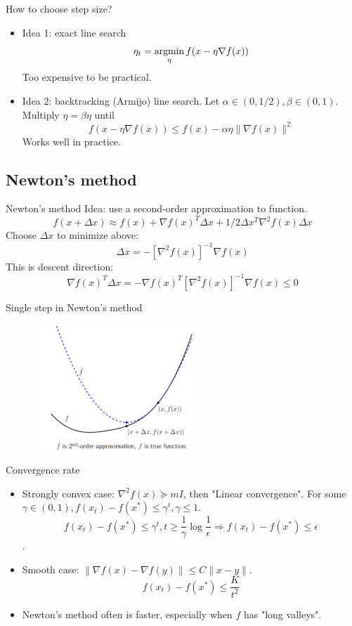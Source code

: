 \documentclass[notes]{beamer}
\begin{document}
\begin{frame}
	{How to choose step size?}
	\begin{itemize}
		\item Idea 1: exact line search
		      \[\eta_t = \mathop{\mathrm{argmin}}_\eta f(x- \eta \nabla f(x) ) \]
		      Too expensive to be practical.
		\item Idea 2: backtracking (Armijo) line search. Let $\alpha \in (0,1/2), \beta \in (0,1)$. Multiply $\eta = \beta \eta $ until
		      \[f(x-\eta \nabla f(x)) \le f(x) -\alpha \eta \| \nabla f(x)\|^2 \]
		      Works well in practice.
	\end{itemize}
\end{frame}

\subsection{Newton's method}
\begin{frame}{Newton's method}
	Idea: use a second-order approximation to function.
	\[f(x+\Delta x) \approx f(x)+\nabla f(x)^T \Delta x + 1/2 \Delta x^T \nabla^2 f(x) \Delta x \]
	Choose $\Delta x $ to minimize above:
	\[\Delta x = - [ \nabla^2 f(x)]^{-1} \nabla f(x) \]
	This is descent direction:
	\[\nabla f(x)^T \Delta x = - \nabla f(x)^T [ \nabla^2 f(x)]^{-1} \nabla f(x)  \le 0  \]
\end{frame}

\begin{frame}
	{Single step in Newton's method}
	\begin{figure}
		\includegraphics[width=0.55\textwidth]{2018-03-05-12-44-34.png}
	\end{figure}
\end{frame}

\begin{frame}
	{Convergence rate}
	\begin{itemize}
		\item Strongly convex case: $\nabla^2f(x) \succeq  mI $, then "Linear convergence". For some $\gamma\in (0,1), f(x_t) - f(x^*) \le \gamma^t , \gamma \le 1 $.
		      \[f(x_t) - f(x^*) \le \gamma^t, t \ge \frac{1}{\gamma} \log \frac{1}{\epsilon} \Rightarrow f(x_t ) - f(x^* ) \le \epsilon \].
		\item Smooth case: $\|\nabla f(x) - \nabla f(y) \| \le C \| x-y \|$.
		      \[ f(x_t) - f(x^*) \le \frac{K}{t^2} \]
		\item Newton's method often is faster, especially when $f$ has "long valleys".
	\end{itemize}
\end{frame}
\end{document}
